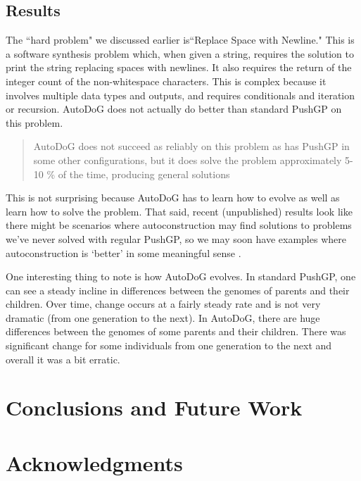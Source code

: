 \documentclass{sig-alternate}
\begin{document}
\subsection{Results}
\label{sec:results}
The ``hard problem" we discussed earlier is``Replace Space with Newline." This is a software synthesis problem which, when given a string, requires the solution to print the string replacing spaces with newlines. It also requires the return of the integer count of the non-whitespace characters. This is complex because it involves multiple data types and outputs, and requires conditionals and iteration or recursion.
AutoDoG does not actually do better than standard PushGP on this problem.
\begin{quotation}
	AutoDoG does not succeed as reliably on this problem as has PushGP in some other configurations, but it does solve the problem approximately 5-10 \% of the time, producing general solutions \cite{spector:2016}
\end{quotation}

This is not surprising because AutoDoG has to learn how to evolve as well as learn how to solve the problem. That said, recent (unpublished) results look like there might be scenarios where autoconstruction may find solutions to problems we've never solved with regular PushGP, so we may soon have examples where autoconstruction is `better' in some meaningful sense \cite{Eva:autoconstruction}.


One interesting thing to note is how AutoDoG evolves. In standard PushGP, one can see a steady incline in differences between the genomes of parents and their children. Over time, change occurs at a fairly steady rate and is not very dramatic (from one generation to the next). In AutoDoG, there are huge differences between the genomes of some parents and their children. There was significant change for some individuals from one generation to the next and overall it was a bit erratic.
\section{Conclusions and Future Work}
\label{sec:conclusion}

\section{Acknowledgments}
\label{sec:acknowledgments}
\end{document}
